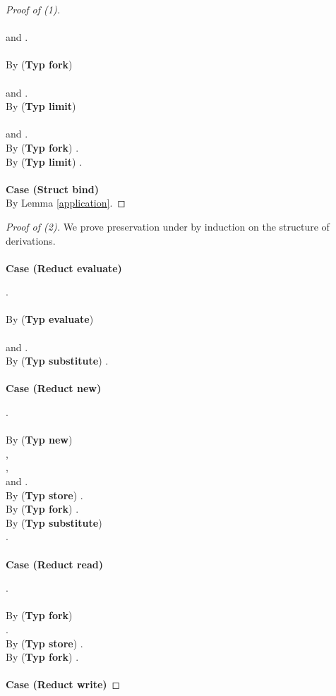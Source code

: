 \documentclass{sigplanconf}
\newcommand{\trule}[1]{(\textbf{Typ #1})}
\begin{document}
\begin{proof}[Proof of (1)]
\\
\\
 and .\\
  \\
By \trule{fork} \\
  \\
 and .\\
By \trule{limit} \\
  \\
 and .\\
By \trule{fork} .\\    
By \trule{limit} .\\
\\
{\bf Case (Struct bind)}\\
By Lemma \ref{application}.
\end{proof}
\begin{proof}[Proof of (2)] We prove preservation under  by induction on the structure of derivations.\\
\\
{\bf Case (Reduct evaluate)}

.\\
\\
By \trule{evaluate} \\
  \\
 and .\\
By \trule{substitute}  .\\
\\
{\bf Case (Reduct new)}

.\\
\\
By \trule{new} \\
 , \\
 , \\
 and .\\
By \trule{store} .\\
By \trule{fork} .\\
By \trule{substitute} \\ 
 .\\
\\
{\bf Case (Reduct read)}

.\\
\\
By \trule{fork}\\
 . \\
By \trule{store} .\\
By \trule{fork} . \\
\\
{\bf Case (Reduct write)}


\end{proof}
\end{document}
